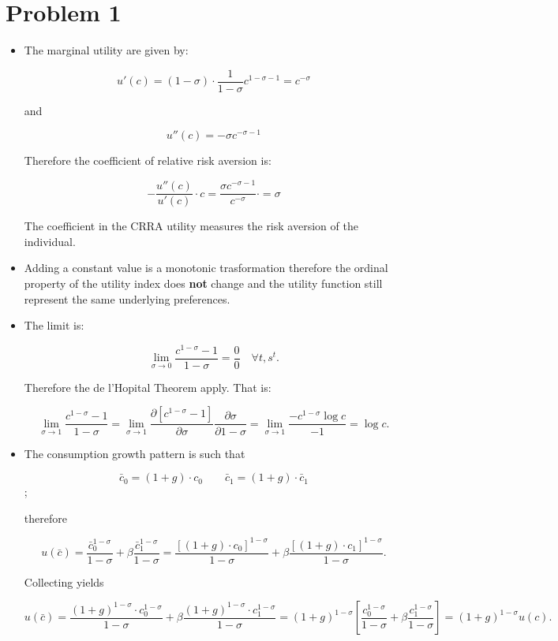 \documentclass[12pt,a4paper]{article}
\begin{document}
\section*{Problem 1}

\begin{itemize}
  \item The marginal utility are given by:

      $$ u'(c) = (1-\sigma) \cdot \frac{1}{1-\sigma} c^{1-\sigma - 1} = c^{-\sigma} $$

    and

      $$ u''(c) = -\sigma c^{-\sigma -1}$$

    Therefore the coefficient of relative risk aversion is:

      $$ -\frac{u''(c)}{u'(c)}\cdot c = \frac{\sigma c^{-\sigma -1}}{c^{-\sigma}} \cdot = \sigma $$

    The coefficient in the CRRA utility measures the risk aversion of the individual.

  \item Adding a constant value is a monotonic trasformation therefore the ordinal property of the utility index does \textbf{not} change and the utility function still represent the same underlying preferences.

  \item The limit is:

    $$ \lim_{\sigma \to 0} \frac{c^{1-\sigma} - 1}{1-\sigma} = \frac{0}{0} \quad \forall t, s^t.$$

  Therefore the de l'Hopital Theorem apply. That is:

    $$\lim_{\sigma \to 1} \frac{c^{1-\sigma} - 1}{1-\sigma} = \lim_{\sigma \to 1} \frac{\partial [c^{1-\sigma} - 1]}{\partial \sigma} \frac{\partial \sigma}{\partial 1-\sigma} = \lim_{\sigma \to 1} \frac{- c^{1-\sigma} \log c}{-1} = \log c.$$

  \item The consumption growth pattern is such that

    $$  \bar{c}_0 = (1 + g) \cdot c_0 \qquad \bar{c}_1 = (1 + g) \cdot \bar{c}_1 $$;

  therefore

    $$  u(\bar{c}) = \frac{\bar{c}_0^{1 - \sigma}}{1 - \sigma} + \beta \frac{\bar{c}_1^{1 - \sigma}}{1 - \sigma} = \frac{[(1 + g) \cdot c_0]^{1-\sigma}}{1-\sigma} + \beta \frac{[(1 + g) \cdot c_1]^{1-\sigma}}{1-\sigma}. $$

  Collecting yields

  $$  u(\bar{c}) = \frac{(1 + g)^{1-\sigma} \cdot c_0^{1-\sigma}}{1-\sigma} + \beta \frac{(1 + g)^{1-\sigma} \cdot c_1^{1-\sigma}}{1-\sigma} = (1 + g)^{1-\sigma} \left[  \frac{c_0^{1 - \sigma}}{1 - \sigma} + \beta \frac{c_1^{1 - \sigma}}{1 - \sigma} \right] = (1 + g)^{1-\sigma} u(c).$$
  

\end{itemize}
\end{document}
